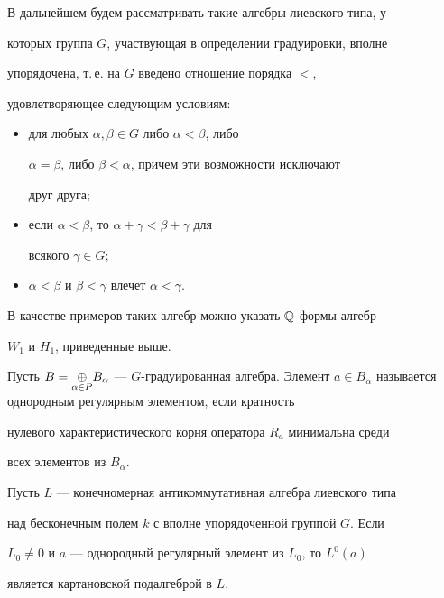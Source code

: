  


В дальнейшем будем рассматривать такие алгебры лиевского типа, у 


которых группа $G$, участвующая в определении градуировки, вполне 


упорядочена, т.\,е. на $G$ введено отношение порядка $<$, 


удовлетворяющее следующим условиям: 


\begin{itemize} 


\item[1)] для любых $\alpha,\beta\in G$ либо $\alpha<\beta$, либо 


$\alpha=\beta$, либо $\beta<\alpha$, причем эти возможности исключают 


друг друга; 


\item[2)] если $\alpha<\beta$, то $\alpha+\gamma<\beta+\gamma$ для 


всякого $\gamma\in G$; 


\item[3)] $\alpha<\beta$ и $\beta<\gamma$ влечет $\alpha<\gamma$. 


\end{itemize} 


 


В качестве примеров таких алгебр можно указать $\Bbb Q$-формы алгебр 


$W_1$ и $H_1$, приведенные выше. 


 


\begin{defn} 


Пусть $B=\aplus B_\alpha$ --- $G$-градуированная алгебра. Элемент $a\in 


B_\alpha$ называется однородным регулярным элементом, если кратность 


нулевого характеристического корня оператора $R_a$ минимальна среди 


всех элементов из $B_\alpha$. 


\end{defn} 


 


\begin{thm} 


Пусть $L$ --- конечномерная антикоммутативная алгебра лиевского типа 


над бесконечным полем $k$ с вполне упорядоченной группой $G$. Если 


$L_0\ne0$ и $a$ --- однородный регулярный элемент из $L_0$, то $L^0(a)$ 


является картановской подалгеброй в $L$. 


\end{thm} 


